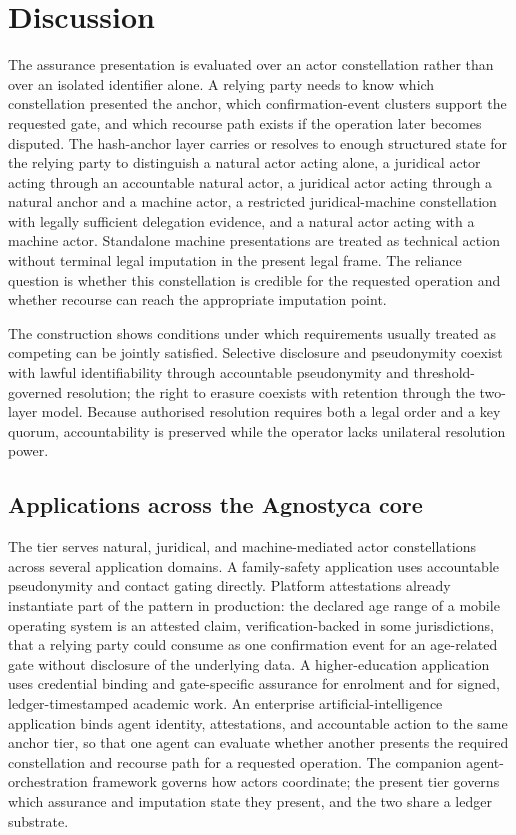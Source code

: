 \documentclass[oneside,10pt]{swissi}
\begin{document}
\bigskip

\section{Discussion}
\label{sec:discussion}

The assurance presentation is evaluated over an actor constellation rather than over an isolated identifier alone. A relying party needs to know which constellation presented the anchor, which confirmation-event clusters support the requested gate, and which recourse path exists if the operation later becomes disputed. The hash-anchor layer carries or resolves to enough structured state for the relying party to distinguish a natural actor acting alone, a juridical actor acting through an accountable natural actor, a juridical actor acting through a natural anchor and a machine actor, a restricted juridical-machine constellation with legally sufficient delegation evidence, and a natural actor acting with a machine actor. Standalone machine presentations are treated as technical action without terminal legal imputation in the present legal frame. The reliance question is whether this constellation is credible for the requested operation and whether recourse can reach the appropriate imputation point.

The construction shows conditions under which requirements usually treated as competing can be jointly satisfied. Selective disclosure and pseudonymity coexist with lawful identifiability through accountable pseudonymity and threshold-governed resolution; the right to erasure coexists with retention through the two-layer model. Because authorised resolution requires both a legal order and a key quorum, accountability is preserved while the operator lacks unilateral resolution power.

\subsection{Applications across the Agnostyca core}

The tier serves natural, juridical, and machine-mediated actor constellations across several application domains. A family-safety application uses accountable pseudonymity and contact gating directly. Platform attestations already instantiate part of the pattern in production: the declared age range of a mobile operating system \cite{appleage2026} is an attested claim, verification-backed in some jurisdictions, that a relying party could consume as one confirmation event for an age-related gate without disclosure of the underlying data. A higher-education application uses credential binding and gate-specific assurance for enrolment and for signed, ledger-timestamped academic work. An enterprise artificial-intelligence application binds agent identity, attestations, and accountable action to the same anchor tier, so that one agent can evaluate whether another presents the required constellation and recourse path for a requested operation. The companion agent-orchestration framework \cite{agnostyca2026} governs how actors coordinate; the present tier governs which assurance and imputation state they present, and the two share a ledger substrate.
\end{document}
